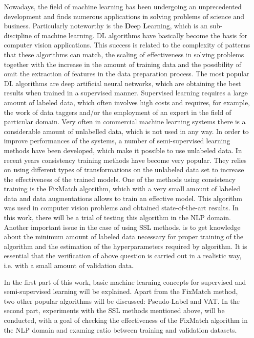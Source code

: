 \documentclass[12pt]{article}
\theoremstyle{definition}
\DeclareRobustCommand{\[}{\begin{equation}}
\DeclareRobustCommand{\]}{\end{equation}}
\begin{document}
Nowadays, the field of machine learning has been undergoing an unprecedented development and finds numerous applications in solving problems of science and business. Particularly noteworthy is the \textbf{D}eep \textbf{L}earning, which is an sub-discipline of machine learning. DL algorithms have basically become the basis for computer vision applications. This success is related to the complexity of patterns that these algorithms can match, the scaling of effectiveness in solving problems together with the increase in the amount of training data and the possibility of omit the extraction of features in the data preparation process. The most popular DL algorithms are deep artificial neural networks, which are obtaining the best results when trained in a supervised manner. Supervised learning requires a large amount of labeled data, which often involves high costs and requires, for example, the work of data taggers and/or the employment of an expert in the field of particular domain.
Very often in commercial machine learning systems there is a considerable amount of unlabelled data, which is not used in any way. In order to improve performances of the systems, a number of semi-supervised learning methods have been developed, which make it possible to use unlabeled data. In recent years consistency training methods have become very popular. They relies on using different types of transformations on the unlabeled data set to increase the effectiveness of the trained models. One of the methods using consistency training is the FixMatch algorithm, which with a very small amount of labeled data and data augmentations allows to train an effective model. This algorithm was used in computer vision problems and obtained state-of-the-art results. In this work, there will be a trial of testing this algorithm in the NLP domain. Another important issue in the case of using SSL methods, is to get knowledge about the minimum amount of labeled data necessary for proper training of the algorithm and the estimation of the hyperparameters required by algorithm. It is essential that the verification of above question is carried out in a realistic way, i.e. with a small amount of validation data. \par
In the first part of this work, basic machine learning concepts for supervised and semi-supervised learning will be explained. Apart from the FixMatch method, two other popular algorithms will be discussed: Pseudo-Label and VAT.
In the second part, experiments with the SSL methods mentioned above, will be conducted, with a goal of checking the effectiveness of the FixMatch algorithm in the NLP domain and examing ratio between training and validation datasets.
 
\end{document}
